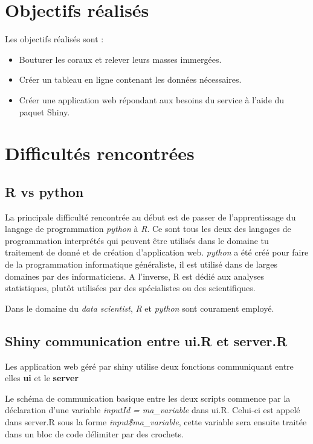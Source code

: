 \documentclass[]{report}
\begin{document}
\section{Objectifs réalisés}\label{objectifs-realises}

Les objectifs réalisés sont :

\begin{itemize}
\item
  Bouturer les coraux et relever leurs masses immergées.
\item
  Créer un tableau en ligne contenant les données nécessaires.
\item
  Créer une application web répondant aux besoins du service à l'aide du
  paquet Shiny.
\end{itemize}

\section{Difficultés rencontrées}\label{difficultes-rencontrees}

\subsection{R vs python}\label{r-vs-python}

La principale difficulté rencontrée au début est de passer de
l'apprentissage du langage de programmation \emph{python} à \emph{R}. Ce
sont tous les deux des langages de programmation interprétés qui peuvent
être utilisés dans le domaine tu traitement de donné et de création
d'application web. \emph{python} a été créé pour faire de la
programmation informatique généraliste, il est utilisé dans de larges
domaines par des informaticiens. A l'inverse, R est dédié aux analyses
statistiques, plutôt utilisées par des spécialistes ou des
scientifiques.

Dans le domaine du \emph{data scientist}, \emph{R} et \emph{python} sont
courament employé.

\subsection{Shiny communication entre ui.R et
server.R}\label{shiny-communication-entre-ui.r-et-server.r}

Les application web géré par shiny utilise deux fonctions communiquant
entre elles \textbf{ui} et le \textbf{server}

Le schéma de communication basique entre les deux scripts commence par
la déclaration d'une variable \emph{inputId = ma\_variable} dans ui.R.
Celui-ci est appelé dans server.R sous la forme
\emph{input\$ma\_variable}, cette variable sera ensuite traitée dans un
bloc de code délimiter par des crochets.
\end{document}

